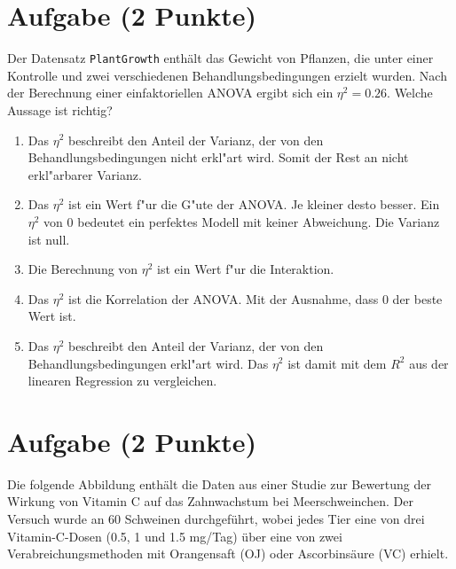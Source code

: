 \documentclass[a4paper, 10pt]{scrartcl}\usepackage[]{graphicx}\usepackage[]{xcolor}
\begin{document}
\section{Aufgabe \hfill (2 Punkte)}



Der Datensatz \texttt{PlantGrowth} enth{\"a}lt das Gewicht von Pflanzen, die
unter einer Kontrolle und zwei verschiedenen Behandlungsbedingungen erzielt
wurden. Nach der Berechnung einer einfaktoriellen ANOVA ergibt sich ein
$\eta^2 = 0.26$. Welche Aussage ist richtig?



\begin{enumerate}
\item [\textbf{A} \msquare] Das $\eta^2$ beschreibt den Anteil der Varianz, der von den Behandlungsbedingungen nicht erkl{"a}rt wird. Somit der Rest an nicht erkl{"a}rbarer Varianz.
\item [\textbf{B} \msquare] Das $\eta^2$ ist ein Wert f{"u}r die G{"u}te der ANOVA. Je kleiner desto besser. Ein $\eta^2$ von 0 bedeutet ein perfektes Modell mit keiner Abweichung. Die Varianz ist null.
\item [\textbf{C} \msquare] Die Berechnung von $\eta^2$ ist ein Wert f{"u}r die Interaktion.
\item [\textbf{D} \msquare] Das $\eta^2$ ist die Korrelation der ANOVA. Mit der Ausnahme, dass 0 der beste Wert ist.
\item [\textbf{E} \msquare] Das $\eta^2$ beschreibt den Anteil der Varianz, der von den Behandlungsbedingungen erkl{"a}rt wird. Das $\eta^2$ ist damit mit dem $R^2$ aus der linearen Regression zu vergleichen.
\end{enumerate} 

\section{Aufgabe \hfill (2 Punkte)}

Die folgende Abbildung enth{\"a}lt die Daten aus einer Studie zur
Bewertung der Wirkung von Vitamin C auf das Zahnwachstum bei
Meerschweinchen. Der Versuch wurde an 60 Schweinen durchgef{\"u}hrt, wobei
jedes Tier eine von drei Vitamin-C-Dosen (0.5, 1 und 1.5 mg/Tag) {\"u}ber eine
von zwei Verabreichungsmethoden mit Orangensaft (OJ)  oder
Ascorbins{\"a}ure (VC) erhielt. 
\end{document}
